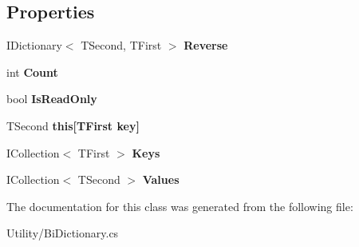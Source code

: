 \subsection*{Properties}
\begin{DoxyCompactItemize}
\item 
\hypertarget{class_snowflake_1_1_utility_1_1_bi_dictionary_aca11c62f168fcf073fea26d9282a4766}{}I\+Dictionary$<$ T\+Second, T\+First $>$ {\bfseries Reverse}\label{class_snowflake_1_1_utility_1_1_bi_dictionary_aca11c62f168fcf073fea26d9282a4766}

\item 
\hypertarget{class_snowflake_1_1_utility_1_1_bi_dictionary_ae9acd45d5a8ad6bae0863db2bfee735e}{}int {\bfseries Count}\label{class_snowflake_1_1_utility_1_1_bi_dictionary_ae9acd45d5a8ad6bae0863db2bfee735e}

\item 
\hypertarget{class_snowflake_1_1_utility_1_1_bi_dictionary_a017281d17e3045e64315de4418ddc786}{}bool {\bfseries Is\+Read\+Only}\label{class_snowflake_1_1_utility_1_1_bi_dictionary_a017281d17e3045e64315de4418ddc786}

\item 
\hypertarget{class_snowflake_1_1_utility_1_1_bi_dictionary_a8ea22f205d3a1fba93a5e78a84cc808c}{}T\+Second {\bfseries this\mbox{[}\+T\+First key\mbox{]}}\label{class_snowflake_1_1_utility_1_1_bi_dictionary_a8ea22f205d3a1fba93a5e78a84cc808c}

\item 
\hypertarget{class_snowflake_1_1_utility_1_1_bi_dictionary_a3fff4ccfda66b4b6db5547959d20a2dc}{}I\+Collection$<$ T\+First $>$ {\bfseries Keys}\label{class_snowflake_1_1_utility_1_1_bi_dictionary_a3fff4ccfda66b4b6db5547959d20a2dc}

\item 
\hypertarget{class_snowflake_1_1_utility_1_1_bi_dictionary_aaf36989a9f6f3b43142c96a8b00afcef}{}I\+Collection$<$ T\+Second $>$ {\bfseries Values}\label{class_snowflake_1_1_utility_1_1_bi_dictionary_aaf36989a9f6f3b43142c96a8b00afcef}

\end{DoxyCompactItemize}


The documentation for this class was generated from the following file\+:\begin{DoxyCompactItemize}
\item 
Utility/Bi\+Dictionary.\+cs\end{DoxyCompactItemize}
